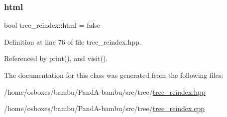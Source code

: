 \mbox{\label{classtree__reindex_a0bda6b15f45a9f79195d0183cdc352de}} 
\subsubsection{\texorpdfstring{html}{html}}
{\footnotesize\ttfamily bool tree\+\_\+reindex\+::html = false\hspace{0.3cm}{\ttfamily [static]}}



Definition at line 76 of file tree\+\_\+reindex.\+hpp.



Referenced by print(), and visit().



The documentation for this class was generated from the following files\+:\begin{DoxyCompactItemize}
\item 
/home/osboxes/bambu/\+Pand\+A-\/bambu/src/tree/\hyperlink{tree__reindex_8hpp}{tree\+\_\+reindex.\+hpp}\item 
/home/osboxes/bambu/\+Pand\+A-\/bambu/src/tree/\hyperlink{tree__reindex_8cpp}{tree\+\_\+reindex.\+cpp}\end{DoxyCompactItemize}
